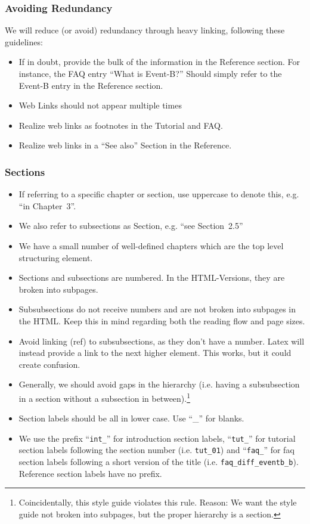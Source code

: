 \subsubsection{Avoiding Redundancy}

We will reduce (or avoid) redundancy through heavy linking, following these guidelines:

\begin{itemize}
	\item If in doubt, provide the bulk of the information in the Reference section.  For instance, the FAQ entry ``What is Event-B?''  Should simply refer to the Event-B entry in the Reference section.
	\item Web Links should not appear multiple times
	\item Realize web links as footnotes in the Tutorial and FAQ.
	\item Realize web links in a ``See also'' Section in the Reference.
\end{itemize}

\subsubsection{Sections}

\begin{itemize}
	\item If referring to a specific chapter or section, use uppercase to denote this, e.g. ``in Chapter~3''.
	\item We also refer to subsections as Section, e.g. ``see Section~2.5''
	\item We have a small number of well-defined chapters which are the top level structuring element.
	\item Sections and subsections are numbered.  In the HTML-Versions, they are broken into subpages.
    \item Subsubsections do not receive numbers and are not broken into subpages in the HTML.  Keep this in mind regarding both the reading flow and page sizes.
	\item Avoid linking (ref) to subsubsections, as they don't have a number.  Latex will instead provide a link to the next higher element.  This works, but it could create confusion.
	\item Generally, we should avoid gaps in the hierarchy (i.e. having a subsubsection in a section without a subsection in between).\footnote{Coincidentally, this style guide violates this rule. Reason: We want the style guide not broken into subpages, but the proper hierarchy is a section.}
	\item Section labels should be all in lower case. Use ``\_'' for blanks.
	\item We use the prefix ``\texttt{int\_}'' for introduction section labels, ``\texttt{tut\_}'' for tutorial section labels following the section number (i.e. \texttt{tut\_01}) and ``\texttt{faq\_}'' for faq section labels following a short version of the title (i.e. \texttt{faq\_diff\_eventb\_b}). Reference section labels have no prefix.
\end{itemize}

